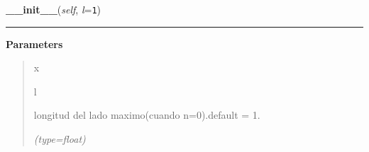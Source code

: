 \hspace{.8\funcindent}\begin{boxedminipage}{\funcwidth}

    \raggedright \textbf{\_\_init\_\_}(\textit{self}, \textit{l}={\tt 1})

    \vspace{-1.5ex}

    \rule{\textwidth}{0.5\fboxrule}
\setlength{\parskip}{2ex}
\setlength{\parskip}{1ex}
      \textbf{Parameters}
      \vspace{-1ex}

      \begin{quote}
        \begin{Ventry}{x}

          \item[l]

          longitud del lado maximo(cuando n=0).default = 1.

            {\it (type=float)}

        \end{Ventry}

      \end{quote}

    \end{boxedminipage}

    \label{FractalZE:sierpinsky:Sierpinsky:countTriangles}

    \vspace{0.5ex}

